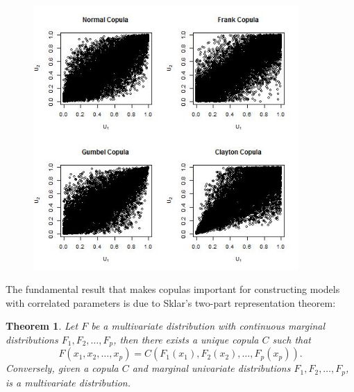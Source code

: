 \begin{figure}
\centering
\includegraphics[width=0.9\textwidth]{4_Copulas}
\caption{}
\label{fig:copula}
\end{figure}


The fundamental result that makes copulas important for constructing models
with  correlated parameters  is due to Sklar's \citeyear{Skl1959} two-part representation
theorem:
%
\newtheorem*{Sklar}{Theorem} 
\begin{Sklar} 
Let $F$ be a multivariate distribution with continuous marginal
distributions $F_1, F_2, \dots, F_p$, then there exists a unique
copula $C$ such that 
%
\begin{equation}
\label{eqn:sklar}
F(x_1, x_2, \dots, x_p) = C(F_1(x_1), F_2(x_2),
\dots, F_p(x_p)).
\end{equation}
%
Conversely, given a copula $C$ and marginal univariate distributions $F_1,
F_2, \dots, F_p$,  is a multivariate distribution.
\end{Sklar}

